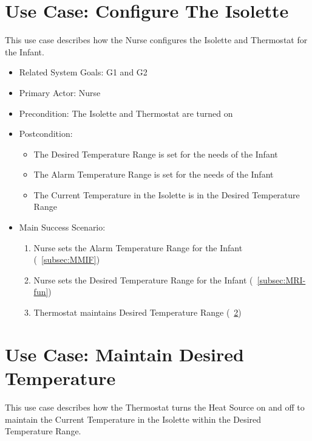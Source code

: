 \section{Use Case:  Configure The Isolette}
\label{sec:uc-configure}

This use case describes how the Nurse configures the Isolette and Thermostat for the Infant.

\begin{itemize}
\item Related System Goals: G1 and G2
\item Primary Actor: Nurse
\item Precondition: The Isolette and Thermostat are turned on
\item Postcondition:
  \begin{itemize}
   \item The Desired Temperature Range is set for the needs of the Infant
   \item The Alarm Temperature Range is set for the needs of the Infant
   \item The Current Temperature in the Isolette is in the Desired Temperature Range
   \end{itemize}
\item Main Success Scenario:
   \begin{enumerate}
   \item Nurse sets the Alarm Temperature Range for the Infant (~\ref{subsec:MMIF})
   \item Nurse sets the Desired Temperature Range for the Infant (~\ref{subsec:MRI-fun})
   \item Thermostat maintains Desired Temperature Range (~\ref{sec:uc-maintain-temperature})
   \end{enumerate}
 \end{itemize}  

\section{Use Case: Maintain Desired Temperature}
\label{sec:uc-maintain-temperature}

This use case describes how the Thermostat turns the Heat Source on and off to maintain the
Current Temperature in the Isolette within the Desired Temperature Range.

